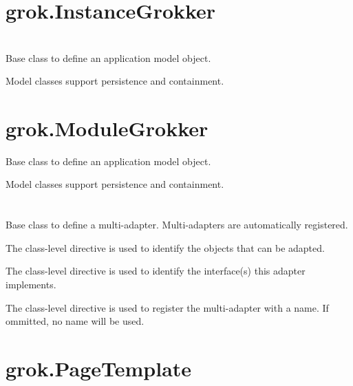 \section{grok.InstanceGrokker}

\section{}

\section{}

\section{}

    Base class to define an application model object.

    Model classes support persistence and containment.

\section{grok.ModuleGrokker}

    Base class to define an application model object.

    Model classes support persistence and containment.

\section{}

    Base class to define a multi-adapter. Multi-adapters are automatically
    registered.

    The class-level directive  is used to identify
    the objects that can be adapted.

    The class-level directive  is used to identify
    the interface(s) this adapter implements.

    The class-level directive  is used to register the
    multi-adapter with a name. If ommitted, no name will be used.

\section{grok.PageTemplate}

